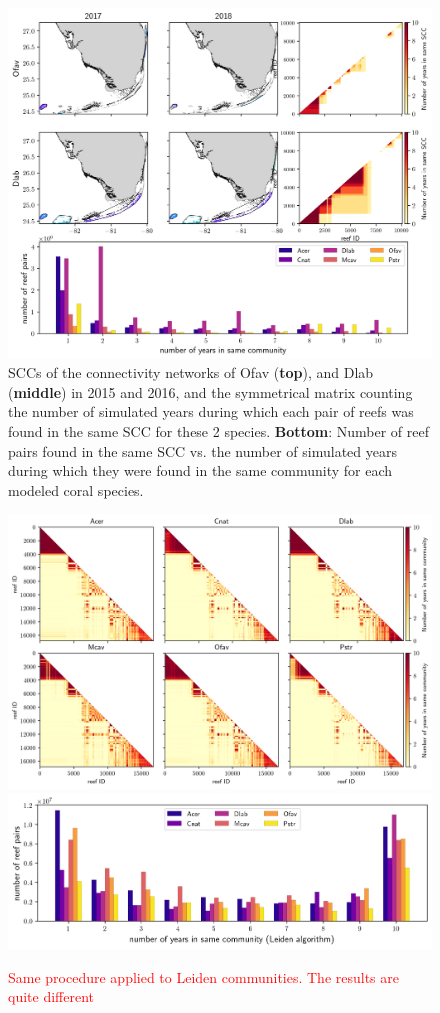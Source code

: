 \documentclass[preprint,12pt,authoryear]{elsarticle}
\begin{document}
\begin{figure}
    \centering
    \includegraphics[width=\textwidth]{figures/comparison_sccs.png}
    \caption{SCCs of the connectivity networks of Ofav (\textbf{top}), and Dlab (\textbf{middle}) in 2015 and 2016, and the symmetrical matrix counting the number of simulated years during which each pair of reefs was found in the same SCC for these 2 species. \textbf{Bottom}: Number of reef pairs found in the same SCC vs. the number of simulated years during which they were found in the same community for each modeled coral species.}\label{fig:scc}
\end{figure}

\begin{figure}
    \centering
    \includegraphics[width=\textwidth]{figures/counters_leiden.png}
    \includegraphics[width=.8\textwidth]{figures/histogram_leiden.png}
    \caption{\textcolor{red}{Same procedure applied to Leiden communities. The results are quite different}}\label{fig:leiden}
\end{figure}
\end{document}
